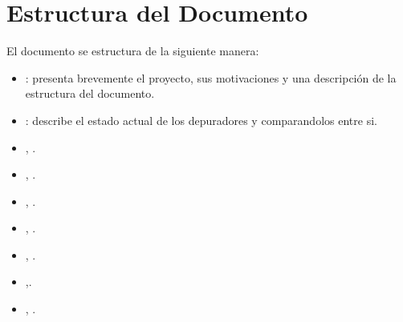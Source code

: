 \section{Estructura del Documento}\label{sec:estructura-documento}
El documento se estructura de la siguiente manera:
\begin{itemize}
  \item {}: presenta brevemente el proyecto, sus motivaciones y una descripción de la estructura del documento.
  \item {}: describe el estado actual de los depuradores y comparandolos entre si.
  \item {}, .
  \item {}, .
  \item {}, .
  \item {}, .
  \item {}, .
  \item {},.
  \item {}, .
\end{itemize}